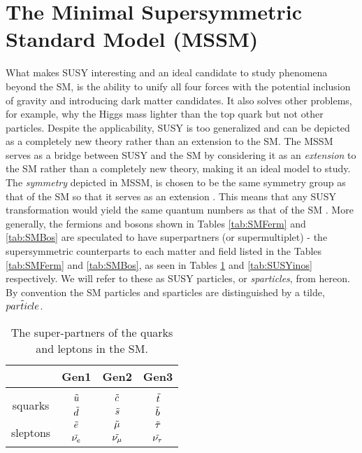 \section{The Minimal Supersymmetric Standard Model (MSSM)}
What makes SUSY interesting and an ideal candidate to study phenomena beyond the SM, is the ability to unify all four forces with the potential inclusion of gravity and introducing dark matter candidates. It also solves other problems, for example, why the Higgs mass lighter than the top quark but not other particles. Despite the applicability, SUSY is too generalized and can be depicted as a completely new theory rather than an extension to the SM. The MSSM serves as a bridge between SUSY and the SM by considering it as an \textit{extension} to the SM rather than a completely new theory, making it an ideal model to study. \\

The \textit{symmetry} depicted in MSSM,  is chosen to be the same symmetry group as that of the SM so that it serves as an extension \cite{baer2006weak}. This means that 
any SUSY transformation would yield the same quantum numbers as that of the SM \cite{aitchison2007supersymmetry}. More generally, the fermions and bosons shown in Tables \ref{tab:SMFerm} and \ref{tab:SMBos} are speculated to have superpartners (or supermultiplet) - the supersymmetric counterparts to each matter and field listed in the Tables \ref{tab:SMFerm} and \ref{tab:SMBos}, as seen in Tables \ref{tab:SUSYspart} and \ref{tab:SUSYinos} respectively. We will refer to these as SUSY particles, or \textit{sparticles}, from hereon. By convention the SM particles and sparticles are distinguished by a tilde, $\Tilde{particle}$.\\

\begin{table}[htbp]
    \centering
    \begin{tabular}{||c|c|c|c||}
    \hline
    & Gen1 & Gen2 & Gen3 \\
    \hline
    & \\[-2.7ex]
    \multirow{2}{1.4cm}{squarks} & $\Tilde{u}$ & $\Tilde{c}$ & \small$\Tilde{t}$ \\
     & $\Tilde{d}$ & $\Tilde{s}$ & $\Tilde{b}$ \\
    \hline
    
    \multirow{2}{1.4cm}{sleptons} & $\Tilde{e}$ & $\Tilde{\mu}$ & $\Tilde{\tau}$ \\
     & $\Tilde{\nu_e}$ & $\Tilde{\nu_\mu}$ & $\Tilde{\nu_\tau}$ \\
    \hline
    \end{tabular}
    \caption{The super-partners of the quarks and leptons in the SM.}
    \label{tab:SUSYspart}
\end{table}

